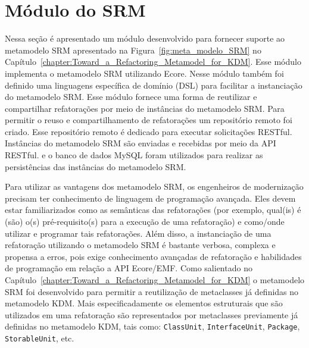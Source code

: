 \section{Módulo do SRM}

Nessa seção é apresentado um módulo desenvolvido para fornecer suporte ao metamodelo SRM apresentado na Figura~\ref{fig:meta_modelo_SRM} no  Capítulo~\ref{chapter:Toward_a_Refactoring_Metamodel_for_KDM}. Esse módulo implementa o metamodelo SRM utilizando Ecore. Nesse módulo também foi definido uma linguagens específica de domínio (DSL) para facilitar a instanciação do metamodelo SRM. Esse módulo fornece uma forma de reutilizar e compartilhar refatorações por meio de instâncias do metamodelo SRM. Para permitir o reuso e compartilhamento de refatorações um repositório remoto foi criado. Esse repositório remoto é dedicado para executar solicitações RESTful. Instâncias do metamodelo SRM são enviadas e recebidas por meio da API RESTful.  e o banco de dados MySQL foram utilizados para realizar as persistências das instâncias do metamodelo SRM.

Para utilizar as vantagens dos metamodelo SRM, os engenheiros de modernização precisam ter conhecimento de linguagem de programação avançada. Eles devem estar familiarizados como as semânticas das refatorações (por exemplo, qual(is) é (são) o(s) pré-requisito(s) para a execução de uma refatoração) e como/onde utilizar e programar tais refatorações. Além disso, a instanciação de uma refatoração utilizando o metamodelo SRM é bastante verbosa, complexa e propensa a erros, pois exige conhecimento avançadas de refatoração e habilidades de programação em relação a API Ecore/EMF. Como salientado no Capítulo~\ref{chapter:Toward_a_Refactoring_Metamodel_for_KDM} o metamodelo SRM foi desenvolvido para permitir a reutilização de metaclasses já definidas no metamodelo KDM. Mais especificadamente os elementos estruturais que são utilizados em uma refatoração são representados por metaclasses previamente já definidas no metamodelo KDM, tais como: \texttt{ClassUnit}, \texttt{InterfaceUnit}, \texttt{Package}, \texttt{StorableUnit}, etc.


